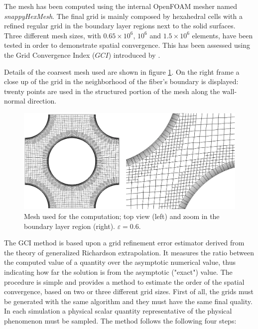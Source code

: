 

The mesh has been computed using  the internal OpenFOAM mesher named \textit{snappyHexMesh}.
The final grid is mainly composed by hexahedral cells with a refined regular grid in the boundary layer regions next to the solid surfaces.
Three different mesh sizes, with $0.65 \times 10^6$, $10^6$ and $1.5 \times 10^6$ elements, have been tested in order to demonstrate spatial convergence. This has been assessed using the Grid Convergence Index ($GCI$) introduced by \citet{roache}.

Details of the coarsest mesh used are shown in figure \ref{fig:mesh1}. On the  right frame a close up of the grid in the neighborhood of the fiber's boundary is displayed: twenty points are used in the structured portion of the mesh along the wall-normal direction.

\begin{figure}[h]
	\centering
	\includegraphics[width=0.8\linewidth]{chapter_4/figure/mesh}
	\caption{Mesh used for the computation; top view (left) and zoom in the boundary layer region (right). $\varepsilon = 0.6$.}
	\label{fig:mesh1}
\end{figure}

The GCI method is based upon a grid refinement error estimator derived from the
theory of generalized Richardson extrapolation. It measures the ratio between the computed value of a quantity over the asymptotic numerical value, thus indicating how far the solution is from the asymptotic ("exact") value.
The procedure is simple and provides a method to estimate the order of the spatial
convergence, based on two or three different grid sizes.
First of all, the grids must be generated with the same algorithm and they must  have the same final quality.
In each simulation  a physical scalar quantity representative of the physical phenomenon must be sampled.
The method follows the following four steps:

